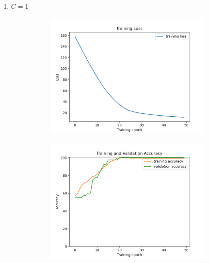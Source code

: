 \documentclass[a4paper]{article}
\begin{document}
\begin{enumerate}
\begin{enumerate}
        \item $C = 1$
        \begin{figure}[H]
            \centering
                \begin{subfigure}[b]{.45\linewidth}
                    \includegraphics[width=\linewidth]{../../img/4-3-1.png}
                \end{subfigure}
                \begin{subfigure}[b]{.45\linewidth}
                    \includegraphics[width=\linewidth]{../../img/4-3-2.png}
                \end{subfigure}
                \begin{subfigure}[b]{.45\linewidth}

\end{subfigure}
\end{figure}
\end{enumerate}
\end{enumerate}
\end{document}
